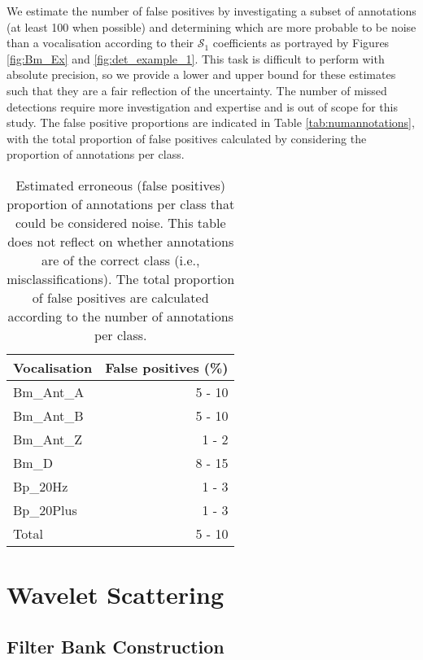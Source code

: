 {We estimate the number of false positives by investigating a subset of annotations (at least 100 when possible) and determining which are more probable to be noise than a vocalisation according to their $\mathcal{S}_1$ coefficients as portrayed by Figures \ref{fig:Bm_Ex} and \ref{fig:det_example_1}. This task is difficult to perform with absolute precision, so we provide a lower and upper bound for these estimates such that they are a fair reflection of the uncertainty. The number of missed detections require more investigation and expertise and is out of scope for this study. The false positive proportions are indicated in Table \ref{tab:numannotations}, with the total proportion of false positives calculated by considering the proportion of annotations per class.

\begin{table}[h!]
    \centering
\caption[Estimated erroneous (false positives) proportion of annotations per class that could be considered noise.]{Estimated erroneous (false positives) proportion of annotations per class that could be considered noise. This table does not reflect on whether annotations are of the correct class (i.e., misclassifications). The total proportion of false positives are calculated according to the number of annotations per class.}
\label{tab:errannotations}
\begin{tabular}{lr} 
\textbf{Vocalisation}      & \textbf{False positives (\%)} \\ \hline
Bm\_Ant\_A & 5 - 10                 \\
Bm\_Ant\_B & 5 - 10                  \\
Bm\_Ant\_Z & 1 - 2                  \\
Bm\_D      & 8 - 15                  \\
Bp\_20Hz & 1 - 3                   \\
Bp\_20Plus & 1 - 3                   \\
Total & 5 - 10\\ 
\end{tabular}
\end{table}




\section{Wavelet Scattering}
\subsection{Filter Bank Construction}

}
